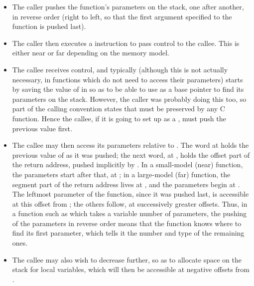 \begin{itemize}
    \item{The caller pushes the function's parameters on the stack, one
        after another, in reverse order (right to left, so that the first
        argument specified to the function is pushed last).}

    \item{The caller then executes a  instruction to pass control
        to the callee. This  is either near or far depending on the
        memory model.}

    \item{The callee receives control, and typically (although this is not
        actually necessary, in functions which do not need to access their
        parameters) starts by saving the value of  in  so as to
        be able to use  as a base pointer to find its parameters on
        the stack. However, the caller was probably doing this too, so part
        of the calling convention states that  must be preserved by
        any C function. Hence the callee, if it is going to set up  as
        a \emph{}, must push the previous value first.}

    \item{The callee may then access its parameters relative to .
        The word at \code{[BP]} holds the previous value of  as it was
        pushed; the next word, at \code{[BP+2]}, holds the offset part of the
        return address, pushed implicitly by . In a small-model
        (near) function, the parameters start after that, at \code{[BP+4]}; in
        a large-model (far) function, the segment part of the return address
        lives at \code{[BP+4]}, and the parameters begin at \code{[BP+6]}. The
        leftmost parameter of the function, since it was pushed last, is
        accessible at this offset from ; the others follow, at
        successively greater offsets. Thus, in a function such as 
        which takes a variable number of parameters, the pushing of the
        parameters in reverse order means that the function knows where to
        find its first parameter, which tells it the number and type of the
        remaining ones.}

    \item{The callee may also wish to decrease  further, so as to
        allocate space on the stack for local variables, which will then be
        accessible at negative offsets from .}


\end{itemize}
